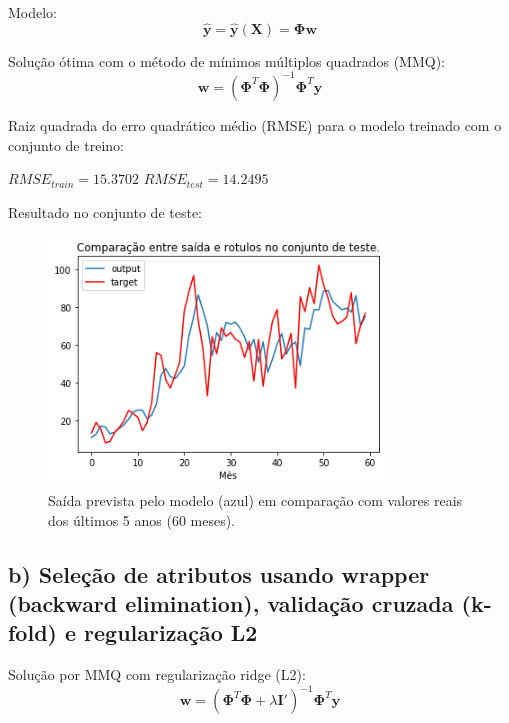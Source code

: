 \documentclass[a4paper, 12pt]{article}
\begin{document}
\vspace{1em}

Modelo:
\begin{equation}
    \mathbf{\hat{y}} = \mathbf{\hat{y}}(\mathbf{X}) = \boldsymbol{\Phi}\mathbf{w}
\end{equation}

Solução ótima com o método de mínimos múltiplos quadrados (MMQ):
\begin{equation}
    \mathbf{w} = (\boldsymbol{\Phi}^T\boldsymbol{\Phi})^{-1}\boldsymbol{\Phi}^T\mathbf{y}
\end{equation}

Raiz quadrada do erro quadrático médio (RMSE) para o modelo treinado com o conjunto de treino:

$ RMSE _{train} = 15.3702$
\hspace{2em}
$ RMSE _{test} = 14.2495$

Resultado no conjunto de teste:

\begin{figure}[h!]
    \centering
    \includegraphics[width=9cm]{images/raw.png}
    \caption{Saída prevista pelo modelo (azul) em comparação com valores reais dos últimos 5 anos (60 meses).}
\end{figure}

\subsection*{b) Seleção de atributos usando wrapper (backward elimination), validação cruzada (k-fold) e regularização L2}

Solução por MMQ com regularização ridge (L2):
\begin{equation}
    \mathbf{w} = (\boldsymbol{\Phi}^T\boldsymbol{\Phi} + \lambda\mathbf{I'})^{-1}\boldsymbol{\Phi}^T\mathbf{y}
\end{equation}
\end{document}
